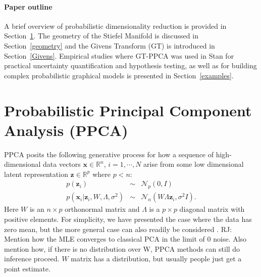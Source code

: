 \documentclass{article}
\newcommand{\commentRJ}[1]{{\textcolor{commentRJ_color}{RJ: #1}}}
\newcommand{\mb}[1]{\mathbf{#1}}
\begin{document}
\paragraph{Paper outline} A brief overview of probabilistic dimensionality reduction is provided in Section~\ref{Probabilistic dimensionality reduction}. The geometry of the Stiefel Manifold is discussed in Section~\ref{geometry} and the Givens Transform (GT) is introduced in Section~\ref{Givens}. Empirical studies where GT-PPCA was used in Stan for practical uncertainty quantification and hypothesis testing, as well as for building complex probabilistic graphical models is presented in Section~\ref{examples}.


\section{Probabilistic Principal Component Analysis (PPCA)} \label{Probabilistic dimensionality reduction}

PPCA posits the following generative process for how a sequence of high-dimensional data vectors $\mathbf{x} \in \mathbb{R}^n$, $i = 1, \cdots, N$ arise from some low dimensional latent representation $\mathbf{z} \in \mathbb{R}^p$ where $p < n$:
\begin{eqnarray}
\label{eq:PpcaGenerativeProcess}
p(\mb{z}_i) &\sim& \mathcal{N}_p(0, I) \nonumber\\
p(\mb{x}_i | \mb{z}_i, W, \Lambda, \sigma^2) &\sim& \mathcal{N}_n(W \Lambda \mb{z}_i, \sigma^2 I).
\end{eqnarray}
Here $W$ is an $n \times p$ orthonormal matrix and $\Lambda$ is a $p \times p$ diagonal matrix with positive elements.  For simplicity, we have presented the case where the data has zero mean, but the more general case can also readily be considered \citep[chapt.~12.1]{murphy2012machine}. \commentRJ{Mention how the MLE converges to classical PCA in the limit of 0 noise.  Also mention how, if there is no distribution over W, PPCA methods can still do inference proceed.} $W$ matrix has a distribution, but usually people just get a point estimate.
\end{document}
